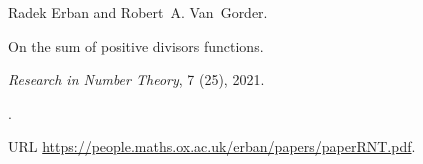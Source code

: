 Radek Erban and Robert~A. Van~Gorder.

\newblock On the sum of positive divisors functions.

\newblock \emph{Research in Number Theory}, 7 (25), 2021.

\newblock {}.

\newblock URL \url{https://people.maths.ox.ac.uk/erban/papers/paperRNT.pdf}.
